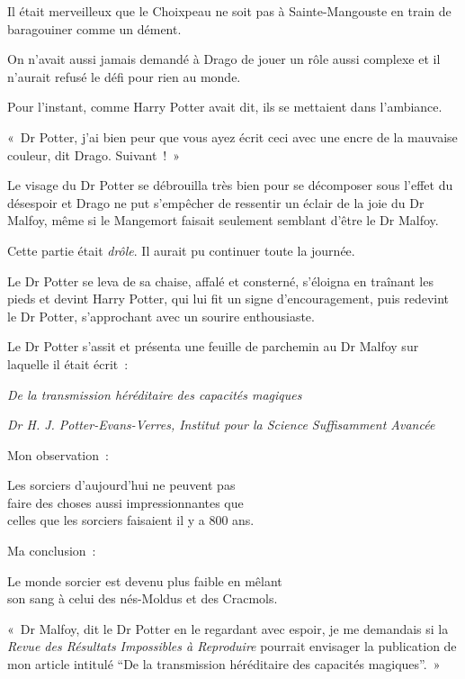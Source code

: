 Il était merveilleux que le Choixpeau ne soit pas à Sainte-Mangouste en train de baragouiner comme un dément.

On n'avait aussi jamais demandé à Drago de jouer un rôle aussi complexe et il n'aurait refusé le défi pour rien au monde.

Pour l'instant, comme Harry Potter avait dit, ils se mettaient dans l'ambiance.

«~Dr Potter, j'ai bien peur que vous ayez écrit ceci avec une encre de la mauvaise couleur, dit Drago.
Suivant~!~»

Le visage du Dr Potter se débrouilla très bien pour se décomposer sous l'effet du désespoir et Drago ne put s'empêcher de ressentir un éclair de la joie du Dr Malfoy, même si le Mangemort faisait seulement semblant d'être le Dr Malfoy.

Cette partie était \emph{drôle}.
Il aurait pu continuer toute la journée.

Le Dr Potter se leva de sa chaise, affalé et consterné, s'éloigna en traînant les pieds et devint Harry Potter, qui lui fit un signe d'encouragement, puis redevint le Dr Potter, s'approchant avec un sourire enthousiaste.

Le Dr Potter s'assit et présenta une feuille de parchemin au Dr Malfoy sur laquelle il était écrit~:
\begin{center}
\emph{De la transmission héréditaire des capacités magiques}

\emph{Dr H.
J. Potter-Evans-Verres, Institut pour la Science Suffisamment Avancée} \end{center}

\begin{writtenNote}
Mon observation~:

Les sorciers d'aujourd'hui ne peuvent pas\\
faire des choses aussi impressionnantes que\\
celles que les sorciers faisaient il y a 800 ans.

Ma conclusion~:

Le monde sorcier est devenu plus faible en mêlant\\
son sang à celui des nés-Moldus et des Cracmols.
\end{writtenNote}

«~Dr Malfoy, dit le Dr Potter en le regardant avec espoir, je me demandais si la \emph{Revue des Résultats Impossibles à Reproduire} pourrait envisager la publication de mon article intitulé “De la transmission héréditaire des capacités magiques”.~»

